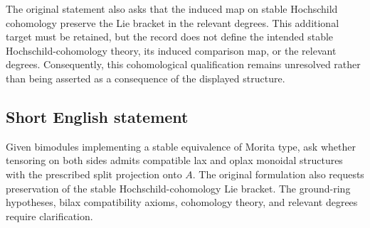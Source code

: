 \documentclass[11pt]{article}
\begin{document}
The original statement also asks that the induced map on stable Hochschild cohomology preserve the Lie bracket in the relevant degrees. This additional target must be retained, but the record does not define the intended stable Hochschild-cohomology theory, its induced comparison map, or the relevant degrees. Consequently, this cohomological qualification remains unresolved rather than being asserted as a consequence of the displayed structure.
\subsection{Short English statement}
Given bimodules implementing a stable equivalence of Morita type, ask whether tensoring on both sides admits compatible lax and oplax monoidal structures with the prescribed split projection onto \(A\). The original formulation also requests preservation of the stable Hochschild-cohomology Lie bracket. The ground-ring hypotheses, bilax compatibility axioms, cohomology theory, and relevant degrees require clarification.
\end{document}
